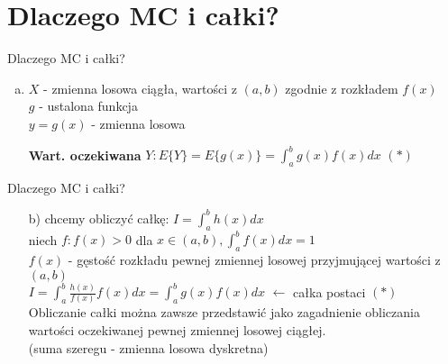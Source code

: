 \section{Dlaczego MC i całki?}
\begin{frame}{Dlaczego MC i całki?}
	\begin{enumerate}[a)]
		\item
        	$X$ - zmienna losowa ciągła, wartości z $(a, b)$ zgodnie z rozkładem $f(x)$ \\
            $g$ - ustalona funkcja \\
            $y = g(x)$ - zmienna losowa
            
            {\bf Wart. oczekiwana} $Y: E\{Y\} = E\{g(x)\} = \int_a^b g(x) f(x) dx$ \hfill $(*)$
	\end{enumerate}
\end{frame}
\begin{frame}{Dlaczego MC i całki?}
	\begin{enumerate}
		\item[b)]
			chcemy obliczyć całkę: $I = \int_a^b h(x) dx$ \\
            niech $f: f(x) > 0$ dla $x \in (a, b), \int_a^b f(x) dx = 1$ \\
            $f(x)$ - gęstość rozkładu pewnej zmiennej losowej przyjmującej wartości z $(a, b)$ \\
            $I = \int_a^b \frac{h(x)}{f(x)} f(x) dx = \int_a^b g(x)f(x)dx$ \hfill $\leftarrow$ całka postaci $(*)$ \\
            Obliczanie całki można zawsze przedstawić jako zagadnienie obliczania wartości oczekiwanej pewnej zmiennej losowej ciągłej.
            \\[8pt]
            (suma szeregu - zmienna losowa dyskretna)
	\end{enumerate}
\end{frame}
